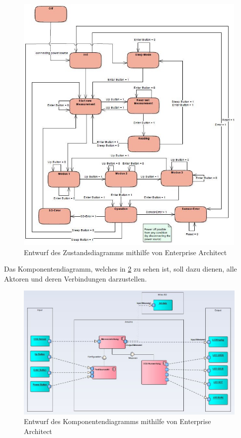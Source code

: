 \begin{figure}[!hbt]
	\centering
	\includegraphics[width=0.9\linewidth]{Images/Statemachine}
	\caption{Entwurf des Zustandsdiagramms mithilfe von Enterprise Architect}
	\label{fig:Statemachine}
\end{figure}

Das Komponentendiagramm, welches in \ref{fig:KomponentenDiagramm} zu sehen ist, soll dazu dienen, alle Aktoren und deren Verbindungen darzustellen. \\

\begin{figure}[!hbt]
	\centering
	\includegraphics[width=0.9\linewidth]{Images/Komponentendiagramm}
	\caption{Entwurf des Komponentendiagramms mithilfe von Enterprise Architect}
	\label{fig:KomponentenDiagramm}
\end{figure}